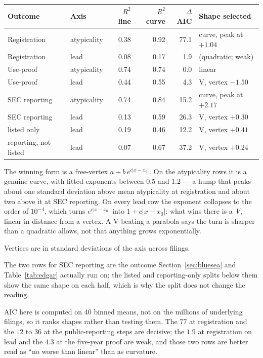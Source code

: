 \begin{center}\small
\begin{tabular}{llrrrl}
\toprule
Outcome & Axis & $R^2$ line & $R^2$ curve & $\Delta$AIC & Shape selected \\
\midrule
Registration & atypicality & 0.38 & 0.92 & 77.1 & curve, peak at $+1.04$ \\
Registration & lead & 0.08 & 0.17 & 1.9 & (quadratic; weak) \\
Use-proof & atypicality & 0.74 & 0.74 & 0.0 & linear \\
Use-proof & lead & 0.44 & 0.55 & 4.3 & V, vertex $-1.50$ \\
SEC reporting & atypicality & 0.74 & 0.84 & 15.2 & curve, peak at $+2.17$ \\
SEC reporting & lead & 0.13 & 0.59 & 26.3 & V, vertex $+0.30$ \\
\quad listed only & lead & 0.19 & 0.46 & 12.2 & V, vertex $+0.41$ \\
\quad reporting, not listed & lead & 0.07 & 0.67 & 37.2 & V, vertex $+0.24$ \\
\bottomrule
\end{tabular}
\end{center}

\noindent The winning form is a free-vertex $a + b\,e^{c|x-x_0|}$. On the
atypicality rows it is a genuine curve, with fitted exponents between $0.5$
and $1.2$ --- a hump that peaks about one standard deviation above mean
atypicality at registration and about two above it at SEC reporting. On every
lead row the exponent collapses to the order of $10^{-4}$, which turns
$e^{c|x-x_0|}$ into $1 + c|x-x_0|$: what wins there is a \emph{V}, linear in
distance from a vertex. A V beating a parabola says the turn is sharper
than a quadratic allows, not that anything grows exponentially.

Vertices are in standard deviations of the axis across filings.

The two rows for SEC reporting are the outcome Section~\ref{sec:bluesea} and
Table~\ref{tab:edgar} actually run on; the listed and reporting-only splits
below them show the same shape on each half, which is why the split does not
change the reading.

AIC here is computed on 40 binned means, not on the millions of underlying
filings, so it ranks shapes rather than testing them. The $77$ at registration
and the $12$ to $36$ at the public-reporting steps are decisive; the $1.9$ at
registration on lead and the $4.3$ at the five-year proof are weak, and those
two rows are better read as ``no worse than linear'' than as curvature.

